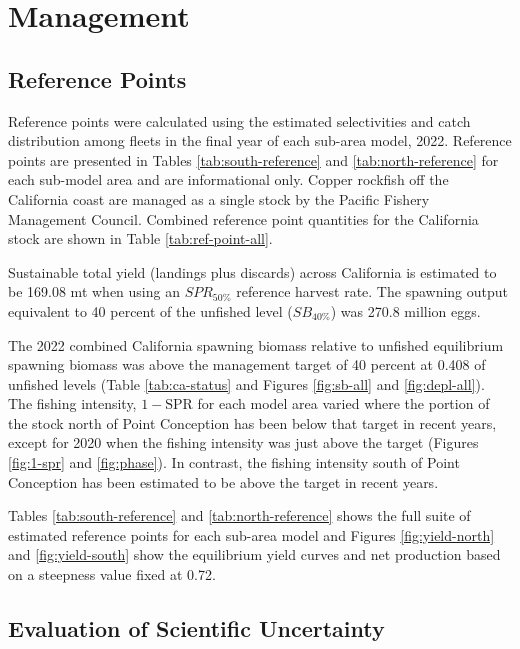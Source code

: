 \documentclass[11pt,
  english,
  letterpaper,
]{article}
\begin{document}
\hypertarget{management}{%
\section{Management}\label{management}}

\hypertarget{reference-points-1}{%
\subsection{Reference Points}\label{reference-points-1}}

Reference points were calculated using the estimated selectivities and catch distribution among fleets in the final year of each sub-area model, 2022. Reference points are presented in Tables \ref{tab:south-reference} and \ref{tab:north-reference} for each sub-model area and are informational only. Copper rockfish off the California coast are managed as a single stock by the Pacific Fishery Management Council. Combined reference point quantities for the California stock are shown in Table \ref{tab:ref-point-all}.

Sustainable total yield (landings plus discards) across California is estimated to be 169.08 mt when using an \(SPR_{50\%}\) reference harvest rate. The spawning output equivalent to 40 percent of the unfished level (\(SB_{40\%}\)) was 270.8 million eggs.

The 2022 combined California spawning biomass relative to unfished equilibrium spawning biomass was above the management target of 40 percent at 0.408 of unfished levels (Table \ref{tab:ca-status} and Figures \ref{fig:sb-all} and \ref{fig:depl-all}). The fishing intensity, \(1-\text{SPR}\) for each model area varied where the portion of the stock north of Point Conception has been below that target in recent years, except for 2020 when the fishing intensity was just above the target (Figures \ref{fig:1-spr} and \ref{fig:phase}). In contrast, the fishing intensity south of Point Conception has been estimated to be above the target in recent years.

Tables \ref{tab:south-reference} and \ref{tab:north-reference} shows the full suite of estimated reference points for each sub-area model and Figures \ref{fig:yield-north} and \ref{fig:yield-south} show the equilibrium yield curves and net production based on a steepness value fixed at 0.72.

\hypertarget{evaluation-of-scientific-uncertainty}{%
\subsection{Evaluation of Scientific Uncertainty}\label{evaluation-of-scientific-uncertainty}}
\end{document}
